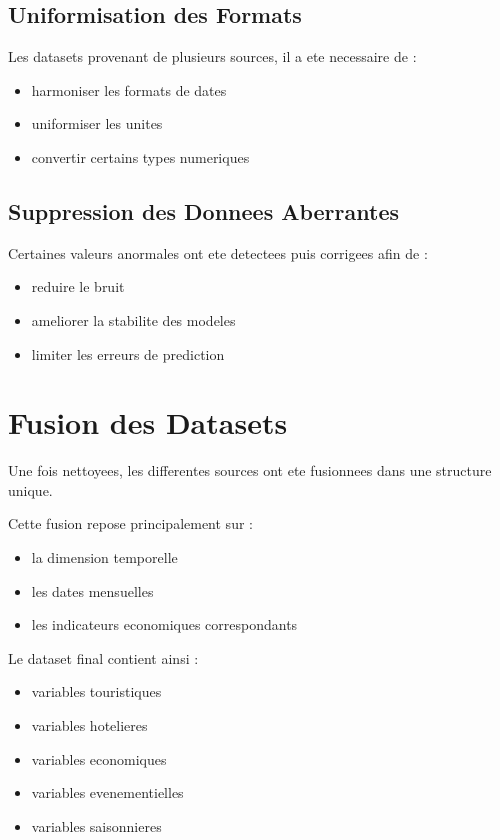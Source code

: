 \documentclass[12pt,a4paper]{report}
\begin{document}
\subsection{Uniformisation des Formats}

Les datasets provenant de plusieurs sources, il a ete necessaire de :

\begin{itemize}
    \item harmoniser les formats de dates
    \item uniformiser les unites
    \item convertir certains types numeriques
\end{itemize}

\subsection{Suppression des Donnees Aberrantes}

Certaines valeurs anormales ont ete detectees puis corrigees afin de :

\begin{itemize}
    \item reduire le bruit
    \item ameliorer la stabilite des modeles
    \item limiter les erreurs de prediction
\end{itemize}

\section{Fusion des Datasets}

Une fois nettoyees, les differentes sources ont ete fusionnees
dans une structure unique.

Cette fusion repose principalement sur :

\begin{itemize}
    \item la dimension temporelle
    \item les dates mensuelles
    \item les indicateurs economiques correspondants
\end{itemize}

Le dataset final contient ainsi :

\begin{itemize}
    \item variables touristiques
    \item variables hotelieres
    \item variables economiques
    \item variables evenementielles
    \item variables saisonnieres
\end{itemize}
\end{document}
